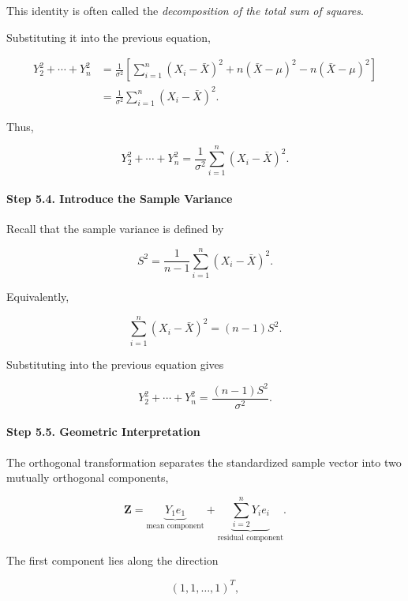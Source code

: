 \documentclass[11pt]{article}
\begin{document}
\begin{mdframed}[
		linewidth=0.8pt,
		roundcorner=6pt,
		backgroundcolor=gray!5,
		linecolor=gray!60,
		innertopmargin=10pt,
		innerbottommargin=10pt,
		innerleftmargin=10pt,
		innerrightmargin=10pt
		]
		This identity is often called the
		\emph{decomposition of the total sum of squares}.
		
		Substituting it into the previous equation,
		
		\[
		\begin{aligned}
			Y_2^2+\cdots+Y_n^2
			&=
			\frac1{\sigma^2}
			\left[
			\sum_{i=1}^{n}(X_i-\bar X)^2
			+
			n(\bar X-\mu)^2
			-
			n(\bar X-\mu)^2
			\right]
			\\
			&=
			\frac1{\sigma^2}
			\sum_{i=1}^{n}(X_i-\bar X)^2.
		\end{aligned}
		\]
		
		Thus,
		
		\[
		\boxed{
			Y_2^2+\cdots+Y_n^2
			=
			\frac1{\sigma^2}
			\sum_{i=1}^{n}(X_i-\bar X)^2.
		}
		\]
		
		\vspace{0.3cm}
		
		\paragraph{Step 5.4. Introduce the Sample Variance}
		
		Recall that the sample variance is defined by
		
		\[
		S^2
		=
		\frac1{n-1}
		\sum_{i=1}^{n}(X_i-\bar X)^2.
		\]
		
		Equivalently,
		
		\[
		\sum_{i=1}^{n}(X_i-\bar X)^2
		=
		(n-1)S^2.
		\]
		
		Substituting into the previous equation gives
		
		\[
		\boxed{
			Y_2^2+\cdots+Y_n^2
			=
			\frac{(n-1)S^2}{\sigma^2}.
		}
		\]
		
		\vspace{0.3cm}
		
		\paragraph{Step 5.5. Geometric Interpretation}
		
		The orthogonal transformation separates the standardized sample vector into
		two mutually orthogonal components,
		
		\[
		\mathbf Z
		=
		\underbrace{Y_1e_1}_{\text{mean component}}
		+
		\underbrace{\sum_{i=2}^{n}Y_ie_i}_{\text{residual component}}.
		\]
		
		The first component lies along the direction
		
		\[
		(1,1,\ldots,1)^T,
		\]
		

\end{mdframed}
\end{document}
